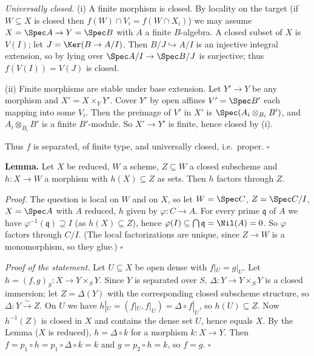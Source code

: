 \documentclass[11pt]{article}
\begin{document}
\emph{Universally closed.} (i) A finite morphism is closed. By locality on the target (if $W\subseteq X$ is closed then $f(W)\cap V_i=f(W\cap X_i)$) we may assume $X=\Spec A\to Y=\Spec B$ with $A$ a finite $B$-algebra. A closed subset of $X$ is $V(I)$; let $J=\Ker(B\to A/I)$. Then $B/J\hookrightarrow A/I$ is an injective integral extension, so by lying over $\Spec A/I\to\Spec B/J$ is surjective; thus $f(V(I))=V(J)$ is closed.

(ii) Finite morphisms are stable under base extension. Let $Y'\to Y$ be any morphism and $X'=X\times_YY'$. Cover $Y'$ by open affines $V'=\Spec B'$ each mapping into some $V_i$. Then the preimage of $V'$ in $X'$ is $\Spec(A_i\otimes_{B_i}B')$, and $A_i\otimes_{B_i}B'$ is a finite $B'$-module. So $X'\to Y'$ is finite, hence closed by (i).

Thus $f$ is separated, of finite type, and universally closed, i.e.\ proper. \hfill$\square$

\pf
\textbf{Lemma.} Let $X$ be reduced, $W$ a scheme, $Z\subseteq W$ a closed subscheme and $h:X\to W$ a morphism with $h(X)\subseteq Z$ as sets. Then $h$ factors through $Z$.

\emph{Proof.} The question is local on $W$ and on $X$, so let $W=\Spec C$, $Z=\Spec C/I$, $X=\Spec A$ with $A$ reduced, $h$ given by $\varphi:C\to A$. For every prime $\mathfrak q$ of $A$ we have $\varphi^{-1}(\mathfrak q)\supseteq I$ (as $h(X)\subseteq Z$), hence $\varphi(I)\subseteq\bigcap\mathfrak q=\Nil(A)=0$. So $\varphi$ factors through $C/I$. (The local factorizations are unique, since $Z\to W$ is a monomorphism, so they glue.) $\square$

\emph{Proof of the statement.} Let $U\subseteq X$ be open dense with $f|_U=g|_U$. Let $h=(f,g)_S:X\to Y\times_SY$. Since $Y$ is separated over $S$, $\Delta:Y\to Y\times_SY$ is a closed immersion; let $Z=\Delta(Y)$ with the corresponding closed subscheme structure, so $\Delta:Y\xrightarrow{\sim}Z$. On $U$ we have $h|_U=(f|_U,f|_U)=\Delta\circ f|_U$, so $h(U)\subseteq Z$. Now $h^{-1}(Z)$ is closed in $X$ and contains the dense set $U$, hence equals $X$. By the Lemma ($X$ is reduced), $h=\Delta\circ k$ for a morphism $k:X\to Y$. Then $f=p_1\circ h=p_1\circ\Delta\circ k=k$ and $g=p_2\circ h=k$, so $f=g$. \hfill$\square$
\end{document}
